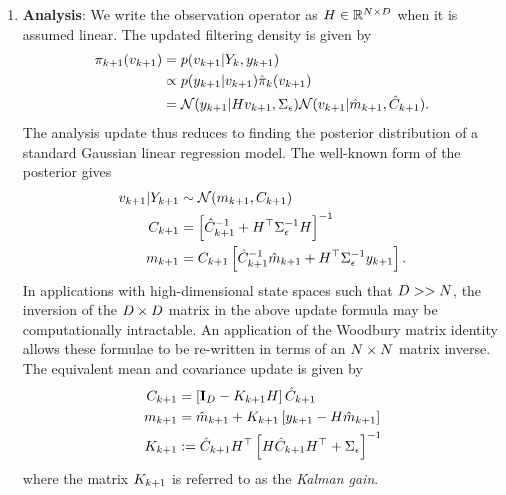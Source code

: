\documentclass[12pt]{article}
\begin{document}
\begin{enumerate}
\item \textbf{Analysis}: We write the observation operator as $\obsOpLin \in \R^{\dimObs \times \dimState}$ when it is assumed linear. 
The updated filtering density is given by 
\begin{align*}
\filterDens[\timeStep+1](\dstate[\timeStep+1]) 
&= p(\dstate[\timeStep+1] | \dataObsCum, \ddataObs[\timeStep+1]) \\
&\propto p(\ddataObs[\timeStep+1] | \dstate[\timeStep+1]) \filterDensPred(\dstate[\timeStep+1]) \\
&= \Gaussian(\ddataObs[\timeStep+1] | \obsOpLin \dstate[\timeStep+1], \CovNoiseObs) \Gaussian(\dstate[\timeStep+1] | \stateMeanPred[\timeStep+1], \stateCovPred[\timeStep+1]).
\end{align*}
The analysis update thus reduces to finding the posterior distribution of a standard Gaussian linear regression model. The well-known form of the posterior gives 
\begin{align*}
\dstate[\timeStep+1] | \dataObsCum[\timeStep+1] &\sim \Gaussian(\stateMean[\timeStep+1], \stateCov[\timeStep+1]) \\
\stateCov[\timeStep+1] &= \left[\stateCovPred[\timeStep+1]^{-1} + \obsOpLin^\top \CovNoiseObs^{-1} \obsOpLin \right]^{-1} \\
\stateMean[\timeStep+1] &= \stateCov[\timeStep+1] \left[\stateCovPred[\timeStep+1]^{-1} \stateMeanPred[\timeStep+1] + \obsOpLin^\top \CovNoiseObs^{-1} \ddataObs[\timeStep+1] \right].
\end{align*}  
In applications with high-dimensional state spaces such that $\dimState >> \dimObs$, the inversion of the $\dimState \times \dimState$ matrix in the above update formula may be 
computationally intractable. An application of the Woodbury matrix identity allows these formulae to be re-written in terms of an $\dimObs \times \dimObs$ matrix inverse. 
The equivalent mean and covariance update is given by
\begin{align*}
\stateCov[\timeStep+1] &= \left[\idMat_{\dimState} - \KGain[\timeStep+1] \obsOpLin \right] \stateCovPred[\timeStep+1] \\
\stateMean[\timeStep+1] &= \stateMeanPred[\timeStep+1] + \KGain[\timeStep+1] \left[\ddataObs[\timeStep+1] - \obsOpLin \stateMeanPred[\timeStep+1] \right] \\
\KGain[\timeStep+1] &:= \stateCovPred[\timeStep+1] \obsOpLin^\top \left[\obsOpLin \stateCovPred[\timeStep+1] \obsOpLin^\top + \CovNoiseObs \right]^{-1}
\end{align*}
where the matrix $\KGain[\timeStep+1]$ is referred to as the \textit{Kalman gain}. 
\end{enumerate}
\end{document}
